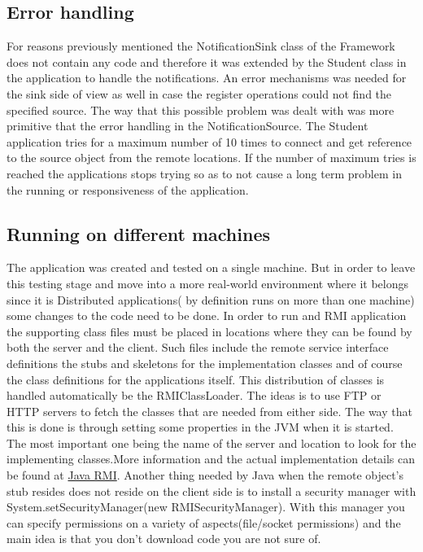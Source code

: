 \documentclass[a4paper,12pt,titlepage]{article}
\begin{document}
\subsection{Error handling}
For reasons previously mentioned the NotificationSink class of the Framework does not contain any code and therefore it was extended by the Student class in the application to handle the notifications. An error mechanisms was needed for the sink side of view as well in case the register operations could not find the specified source. The way that this possible problem was dealt with was more primitive that the error handling in the NotificationSource. The Student application tries for a maximum number of 10 times to connect and get reference to the source object from the remote locations. If the number of maximum tries is reached the applications stops trying so as to not cause a long term problem in the running or responsiveness of the application.
\subsection{Running on different machines}
The application was created and tested on a single machine. But in order to leave this testing stage and move into a more real-world environment where it belongs since it is Distributed applications( by definition runs on more than one machine) some changes to the code need to be done. In order to run and RMI application the supporting class files must be placed in locations where they can be found by both the server and the client. Such files include the remote service interface definitions the stubs and skeletons for the implementation classes and of course the class definitions for the applications itself. This distribution of classes is handled automatically be the RMIClassLoader. The ideas is to use FTP or HTTP servers to fetch the classes that are needed from either side. The way that this is done is through setting some properties in the JVM when it is started. The most important one being the name of the server and location to look for the implementing classes.More information and the actual implementation details can be found at \href{http://java.sun.com/developer/onlineTraining/rmi/RMI.html#DistributingRMIClasses}{Java RMI}. Another thing needed by Java when the remote object's stub resides does not reside on the client side is to install a security manager with System.setSecurityManager(new RMISecurityManager). With this manager you can specify permissions on a variety of aspects(file/socket permissions) and the main idea is that you don't download code you are not sure of.
\end{document}
